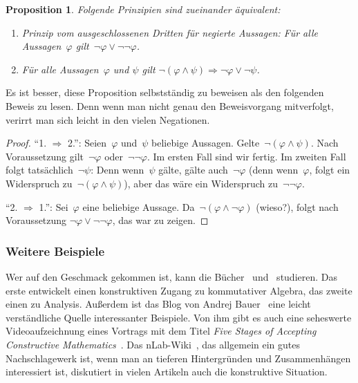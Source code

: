 \documentclass[a4paper,ngerman,12pt]{scrartcl}
\theoremstyle{definition}
\theoremstyle{plain}
\newtheorem{prop}[defn]{Proposition}
\theoremstyle{remark}
\renewcommand{\_}{\mathpunct{.}\,}
\newcommand{\?}{\,{:}\,}
\begin{document}
\begin{prop}Folgende Prinzipien sind zueinander äquivalent:
\begin{enumerate}
\item[1.] Prinzip vom ausgeschlossenen Dritten für negierte Aussagen: Für alle Aussagen~$\varphi$
gilt~$\neg\varphi \vee \neg\neg\varphi$.
\item[2.] Für alle Aussagen~$\varphi$ und $\psi$ gilt $\neg(\varphi \wedge \psi)
\Longrightarrow \neg\varphi \vee \neg\psi$.
\end{enumerate}
\end{prop}
Es ist besser, diese Proposition selbstständig zu beweisen als den folgenden
Beweis zu lesen. Denn wenn man nicht genau den Beweisvorgang mitverfolgt,
verirrt man sich leicht in den vielen Negationen.
\begin{proof}"`1. $\Rightarrow$ 2."': Seien~$\varphi$ und~$\psi$ beliebige
Aussagen. Gelte~$\neg(\varphi \wedge \psi)$. Nach
Voraussetzung gilt~$\neg\varphi$ oder~$\neg\neg\varphi$. Im ersten Fall sind
wir fertig. Im zweiten Fall folgt tatsächlich~$\neg\psi$: Denn
wenn~$\psi$ gälte, gälte auch~$\neg\varphi$ (denn wenn~$\varphi$, folgt ein
Widerspruch zu~$\neg(\varphi \wedge \psi)$), aber das wäre ein Widerspruch
zu~$\neg\neg\varphi$.

"`2. $\Rightarrow$ 1."': Sei~$\varphi$ eine beliebige Aussage. Da~$\neg(\varphi
\wedge \neg\varphi)$ (wieso?), folgt nach Voraussetzung $\neg\varphi \vee
\neg\neg\varphi$, das war zu zeigen.
\end{proof}


\subsubsection*{Weitere Beispiele}

Wer auf den Geschmack gekommen ist, kann die
Bücher~\cite{mines:richman:ruitenburg} und~\cite{bishop:bridges:bible}
studieren. Das erste entwickelt einen konstruktiven Zugang zu kommutativer Algebra, das
zweite einen zu Analysis. Außerdem ist das Blog von Andrej
Bauer~\cite{bauer:blog} eine leicht verständliche Quelle interessanter Beispiele. Von ihm gibt es
auch eine seheswerte Videoaufzeichnung eines Vortrags mit dem Titel \emph{Five
Stages of Accepting Constructive Mathematics}~\cite{bauer:video}. Das
nLab-Wiki~\cite{nlab}, das allgemein ein gutes Nachschlagewerk ist, wenn man an
tieferen Hintergründen und Zusammenhängen interessiert ist, diskutiert in vielen Artikeln auch die
konstruktive Situation.
\end{document}
